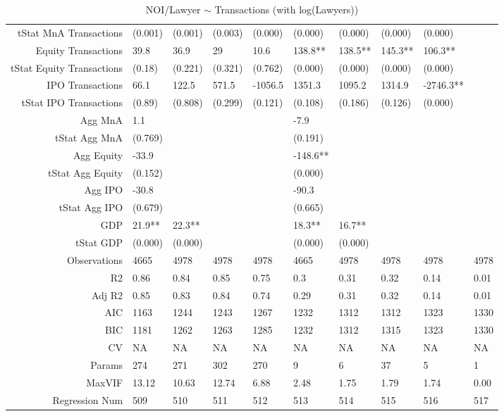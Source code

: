 \begin{table}[ht]
\begin{tabular}{rlllllllll}
  tStat MnA Transactions & (0.001) & (0.001) & (0.003) & (0.000) & (0.000) & (0.000) & (0.000) & (0.000) &  \\ 
  Equity Transactions & 39.8 & 36.9 & 29 & 10.6 & 138.8** & 138.5** & 145.3** & 106.3** &  \\ 
  tStat Equity Transactions & (0.18) & (0.221) & (0.321) & (0.762) & (0.000) & (0.000) & (0.000) & (0.000) &  \\ 
  IPO Transactions & 66.1 & 122.5 & 571.5 & -1056.5 & 1351.3 & 1095.2 & 1314.9 & -2746.3** &  \\ 
  tStat IPO Transactions & (0.89) & (0.808) & (0.299) & (0.121) & (0.108) & (0.186) & (0.126) & (0.000) &  \\ 
  Agg MnA & 1.1 &  &  &  & -7.9 &  &  &  &  \\ 
  tStat Agg MnA & (0.769) &  &  &  & (0.191) &  &  &  &  \\ 
  Agg Equity & -33.9 &  &  &  & -148.6** &  &  &  &  \\ 
  tStat Agg Equity & (0.152) &  &  &  & (0.000) &  &  &  &  \\ 
  Agg IPO & -30.8 &  &  &  & -90.3 &  &  &  &  \\ 
  tStat Agg IPO & (0.679) &  &  &  & (0.665) &  &  &  &  \\ 
  GDP & 21.9** & 22.3** &  &  & 18.3** & 16.7** &  &  &  \\ 
  tStat GDP & (0.000) & (0.000) &  &  & (0.000) & (0.000) &  &  &  \\ 
  Observations & 4665 & 4978 & 4978 & 4978 & 4665 & 4978 & 4978 & 4978 & 4978 \\ 
  R2 & 0.86 & 0.84 & 0.85 & 0.75 & 0.3 & 0.31 & 0.32 & 0.14 & 0.01 \\ 
  Adj R2 & 0.85 & 0.83 & 0.84 & 0.74 & 0.29 & 0.31 & 0.32 & 0.14 & 0.01 \\ 
  AIC & 1163 & 1244 & 1243 & 1267 & 1232 & 1312 & 1312 & 1323 & 1330 \\ 
  BIC & 1181 & 1262 & 1263 & 1285 & 1232 & 1312 & 1315 & 1323 & 1330 \\ 
  CV & NA & NA & NA & NA & NA & NA & NA & NA & NA \\ 
  Params & 274 & 271 & 302 & 270 & 9 & 6 & 37 & 5 & 1 \\ 
  MaxVIF & 13.12 & 10.63 & 12.74 & 6.88 & 2.48 & 1.75 & 1.79 & 1.74 & 0.00 \\ 
  Regression Num & 509 & 510 & 511 & 512 & 513 & 514 & 515 & 516 & 517 \\ 
   \hline
\end{tabular}
\caption{NOI/Lawyer $\sim$ Transactions (with log(Lawyers))} 
\end{table}
